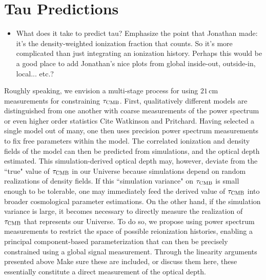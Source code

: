 \documentclass[twocolumn,aps,prd,nofootinbib,showpacs]{revtex4-1}
\begin{document}
\section{Tau Predictions}

\begin{itemize}
\item What does it take to predict tau? Emphasize the point that Jonathan made: it's the density-weighted ionization fraction that counts. So it's more complicated than just integrating an ionization history. Perhaps this would be a good place to add Jonathan's nice plots from global inside-out, outside-in, local... etc.?
\end{itemize}

Roughly speaking, we envision a multi-stage process for using $21\,\textrm{cm}$ measurements for constraining $\tau_\textrm{CMB}$. First, qualitatively different models are distinguished from one another with coarse measurements of the power spectrum or even higher order statistics \acl{Cite Watkinson and Pritchard}. Having selected a single model out of many, one then uses precision power spectrum measurements to fix free parameters within the model. The correlated ionization and density fields of the model can then be predicted from simulations, and the optical depth estimated. This simulation-derived optical depth may, however, deviate from the ``true" value of $\tau_\textrm{CMB}$ in our Universe because simulations depend on random realizations of density fields. If this ``simulation variance" on $\tau_\textrm{CMB}$ is small enough to be tolerable, one may immediately feed the derived value of $\tau_\textrm{CMB}$ into broader cosmological parameter estimations. On the other hand, if the simulation variance is large, it becomes necessary to directly measure the realization of $\tau_\textrm{CMB}$ that represents our Universe. To do so, we propose using power spectrum measurements to restrict the space of possible reionization histories, enabling a principal component-based parameterization that can then be precisely constrained using a global signal measurement. Through the linearity arguments presented above \acl{Make sure these are included, or discuss them here}, these essentially constitute a direct measurement of the optical depth.
\end{document}
